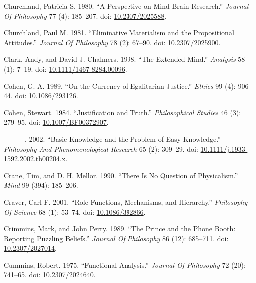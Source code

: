 \documentclass[
  10pt,
  letterpaper,
  DIV=11,
  numbers=noendperiod,
  twoside]{scrartcl}
\newlength{\cslhangindent}
\newenvironment{CSLReferences}[2] %
 {\begin{list}{}{%
  \setlength{\itemindent}{0pt}
  \setlength{\leftmargin}{0pt}
  \setlength{\parsep}{0pt}
  \ifodd #1
   \setlength{\leftmargin}{\cslhangindent}
   \setlength{\itemindent}{-1\cslhangindent}
  \fi
  \setlength{\itemsep}{#2\baselineskip}}}
 {\end{list}}
\begin{document}
\begin{CSLReferences}{1}{0}
Churchland, Patricia S. 1980. {``A Perspective on Mind-Brain
Research.''} \emph{Journal Of Philosophy} 77 (4): 185--207. doi:
\href{https://doi.org/10.2307/2025588}{10.2307/2025588}.

Churchland, Paul M. 1981. {``Eliminative Materialism and the
Propositional Attitudes.''} \emph{Journal Of Philosophy} 78 (2): 67--90.
doi: \href{https://doi.org/10.2307/2025900}{10.2307/2025900}.

Clark, Andy, and David J. Chalmers. 1998. {``The Extended Mind.''}
\emph{Analysis} 58 (1): 7--19. doi:
\href{https://doi.org/10.1111/1467-8284.00096}{10.1111/1467-8284.00096}.

Cohen, G. A. 1989. {``On the Currency of Egalitarian Justice.''}
\emph{Ethics} 99 (4): 906--44. doi:
\href{https://doi.org/10.1086/293126}{10.1086/293126}.

Cohen, Stewart. 1984. {``Justification and Truth.''} \emph{Philosophical
Studies} 46 (3): 279--95. doi:
\href{https://doi.org/10.1007/BF00372907}{10.1007/BF00372907}.

---------. 2002. {``Basic Knowledge and the Problem of Easy
Knowledge.''} \emph{Philosophy And Phenomenological Research} 65 (2):
309--29. doi:
\href{https://doi.org/10.1111/j.1933-1592.2002.tb00204.x}{10.1111/j.1933-1592.2002.tb00204.x}.

Crane, Tim, and D. H. Mellor. 1990. {``There Is No Question of
Physicalism.''} \emph{Mind} 99 (394): 185--206.

Craver, Carl F. 2001. {``Role Functions, Mechanisms, and Hierarchy.''}
\emph{Philosophy Of Science} 68 (1): 53--74. doi:
\href{https://doi.org/10.1086/392866}{10.1086/392866}.

Crimmins, Mark, and John Perry. 1989. {``The Prince and the Phone Booth:
Reporting Puzzling Beliefs.''} \emph{Journal Of Philosophy} 86 (12):
685--711. doi: \href{https://doi.org/10.2307/2027014}{10.2307/2027014}.

Cummins, Robert. 1975. {``Functional Analysis.''} \emph{Journal Of
Philosophy} 72 (20): 741--65. doi:
\href{https://doi.org/10.2307/2024640}{10.2307/2024640}.


\end{CSLReferences}
\end{document}
